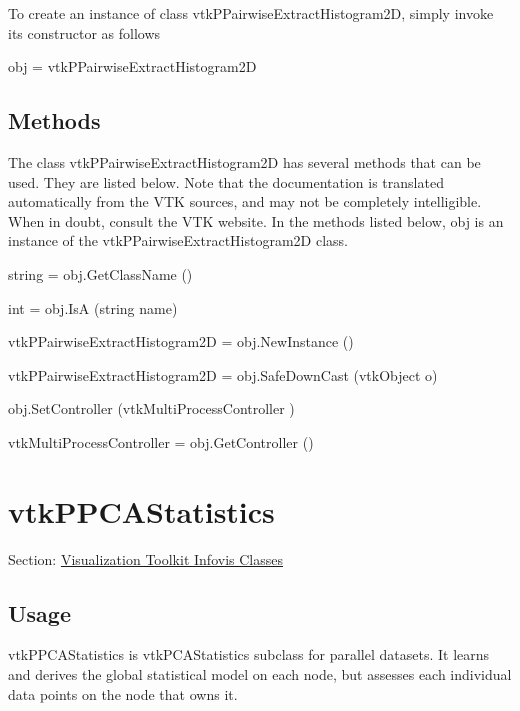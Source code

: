 To create an instance of class vtk\-P\-Pairwise\-Extract\-Histogram2\-D, simply invoke its constructor as follows \begin{DoxyVerb}  obj = vtkPPairwiseExtractHistogram2D
\end{DoxyVerb}
 \hypertarget{vtkwidgets_vtkxyplotwidget_Methods}{}\subsection{Methods}\label{vtkwidgets_vtkxyplotwidget_Methods}
The class vtk\-P\-Pairwise\-Extract\-Histogram2\-D has several methods that can be used. They are listed below. Note that the documentation is translated automatically from the V\-T\-K sources, and may not be completely intelligible. When in doubt, consult the V\-T\-K website. In the methods listed below, {\ttfamily obj} is an instance of the vtk\-P\-Pairwise\-Extract\-Histogram2\-D class. 
\begin{DoxyItemize}
\item {\ttfamily string = obj.\-Get\-Class\-Name ()}  
\item {\ttfamily int = obj.\-Is\-A (string name)}  
\item {\ttfamily vtk\-P\-Pairwise\-Extract\-Histogram2\-D = obj.\-New\-Instance ()}  
\item {\ttfamily vtk\-P\-Pairwise\-Extract\-Histogram2\-D = obj.\-Safe\-Down\-Cast (vtk\-Object o)}  
\item {\ttfamily obj.\-Set\-Controller (vtk\-Multi\-Process\-Controller )}  
\item {\ttfamily vtk\-Multi\-Process\-Controller = obj.\-Get\-Controller ()}  
\end{DoxyItemize}\hypertarget{vtkinfovis_vtkppcastatistics}{}\section{vtk\-P\-P\-C\-A\-Statistics}\label{vtkinfovis_vtkppcastatistics}
Section\-: \hyperlink{sec_vtkinfovis}{Visualization Toolkit Infovis Classes} \hypertarget{vtkwidgets_vtkxyplotwidget_Usage}{}\subsection{Usage}\label{vtkwidgets_vtkxyplotwidget_Usage}
vtk\-P\-P\-C\-A\-Statistics is vtk\-P\-C\-A\-Statistics subclass for parallel datasets. It learns and derives the global statistical model on each node, but assesses each individual data points on the node that owns it.

